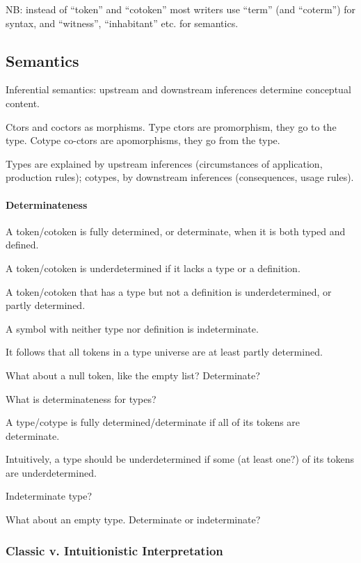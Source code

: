 NB: instead of ``token'' and ``cotoken'' most writers use ``term''
(and ``coterm'') for syntax, and ``witness'', ``inhabitant'' etc. for
semantics.

\subsection{Semantics}

Inferential semantics: upstream and downstream inferences determine
conceptual content.

Ctors and coctors as morphisms. Type ctors are promorphism, they go to
the type. Cotype co-ctors are apomorphisms, they go from the type.

Types are explained by upstream inferences (circumstances of
application, production rules); cotypes, by downstream inferences
(consequences, usage rules).

\paragraph{Determinateness}

A token/cotoken is fully determined, or determinate, when it is both typed and defined.

A token/cotoken is underdetermined if it lacks a type or a definition.

A token/cotoken that has a type but not a definition is
underdetermined, or partly determined.

A symbol with neither type nor definition is indeterminate.

It follows that all tokens in a type universe are at least partly
determined.

What about a null token, like the empty list? Determinate?

What is determinateness for types?

A type/cotype is fully determined/determinate if all of its tokens are
determinate.

Intuitively, a type should be underdetermined if some (at least one?)
of its tokens are underdetermined.

Indeterminate type?

What about an empty type. Determinate or indeterminate?

\subsubsection{Classic v. Intuitionistic Interpretation}

